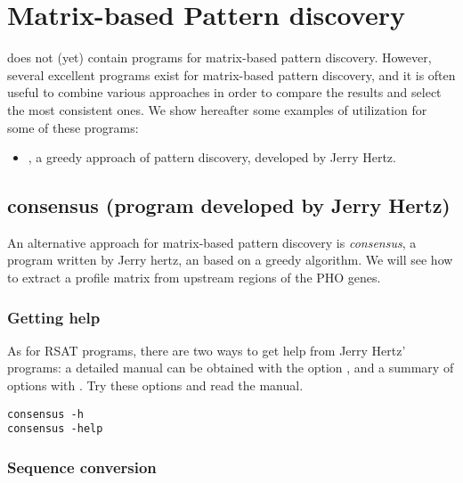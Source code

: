 \chapter{Matrix-based Pattern discovery}

\RSAT does not (yet) contain programs for matrix-based pattern
discovery. However, several excellent programs exist for matrix-based
pattern discovery, and it is often useful to combine various
approaches in order to compare the results and select the most
consistent ones. We show hereafter some examples of utilization for
some of these programs:

\begin{itemize}

\item {}, a greedy approach of pattern discovery,
  developed by Jerry Hertz.

\end{itemize}

\section{consensus (program developed by Jerry Hertz)}

An alternative approach for matrix-based pattern discovery is
\textit{consensus}, a program written by Jerry hertz, an based on a
greedy algorithm. We will see how to extract a profile matrix from
upstream regions of the PHO genes.

\subsection{Getting help}

As for RSAT programs, there are two ways to get help from Jerry Hertz'
programs: a detailed manual can be obtained with the option
, and a summary of options with . Try these
options and read the manual.

{\color{Blue} \begin{footnotesize} 
\begin{verbatim}
consensus -h
consensus -help
\end{verbatim} \end{footnotesize}
}


\subsection{Sequence conversion}


